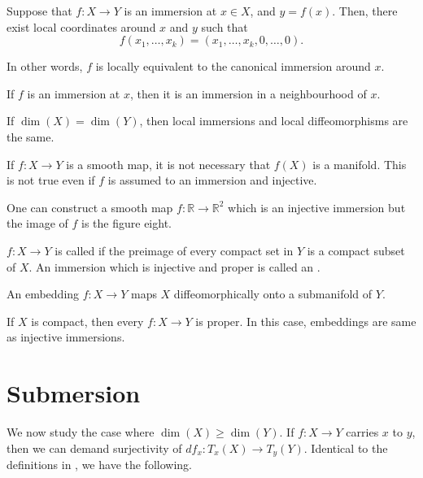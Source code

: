 \documentclass[12pt]{article}
\begin{document}
\begin{thm}
	Suppose that $f : X \to Y$ is an immersion at $x \in X$, and $y = f(x)$. Then, there exist local coordinates around $x$ and $y$ such that
	\begin{equation*} 
		f(x_{1}, \ldots, x_{k}) = (x_{1}, \ldots, x_{k}, 0, \ldots, 0).
	\end{equation*}

	In other words, $f$ is locally equivalent to the canonical immersion around $x$.
\end{thm}

\begin{cor}
	If $f$ is an immersion at $x$, then it is an immersion in a neighbourhood of $x$.
\end{cor}

\begin{rem}
	If $\dim(X) = \dim(Y)$, then local immersions and local diffeomorphisms are the same.
\end{rem}

\begin{rem}
	If $f : X \to Y$ is a smooth map, it is not necessary that $f(X)$ is a manifold. This is not true even if $f$ is assumed to an immersion and injective. 

	One can construct a smooth map $f : \mathbb{R} \to \mathbb{R}^{2}$ which is an injective immersion but the image of $f$ is the figure eight.
\end{rem}

\begin{defn}
	$f : X \to Y$ is called  if the preimage of every compact set in $Y$ is a compact subset of $X$. An immersion which is injective and proper is called an .
\end{defn}

\begin{thm}
	An embedding $f : X \to Y$ maps $X$ diffeomorphically onto a submanifold of $Y$.
\end{thm}

\begin{rem}
	If $X$ is compact, then every $f : X \to Y$ is proper. In this case, embeddings are same as injective immersions.
\end{rem}

\section{Submersion}

We now study the case where $\dim(X) \ge \dim(Y)$. If $f : X \to Y$ carries $x$ to $y$, then we can demand surjectivity of $df_{x} : T_{x}(X) \to T_{y}(Y)$. Identical to the definitions in , we have the following.
\end{document}
